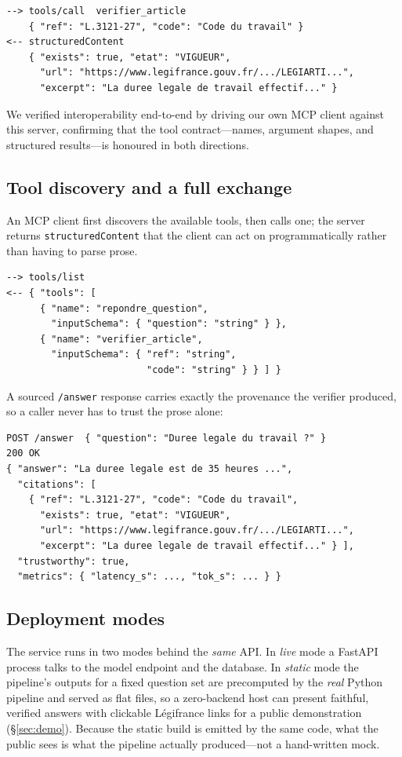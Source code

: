 \begin{lstlisting}[style=lr]
--> tools/call  verifier_article
    { "ref": "L.3121-27", "code": "Code du travail" }
<-- structuredContent
    { "exists": true, "etat": "VIGUEUR",
      "url": "https://www.legifrance.gouv.fr/.../LEGIARTI...",
      "excerpt": "La duree legale de travail effectif..." }
\end{lstlisting}

We verified interoperability end-to-end by driving our own MCP client against
this server, confirming that the tool contract---names, argument shapes, and
structured results---is honoured in both directions.

\subsection{Tool discovery and a full exchange}
An MCP client first discovers the available tools, then calls one; the server
returns \texttt{structuredContent} that the client can act on programmatically
rather than having to parse prose.

\begin{lstlisting}[style=lr]
--> tools/list
<-- { "tools": [
      { "name": "repondre_question",
        "inputSchema": { "question": "string" } },
      { "name": "verifier_article",
        "inputSchema": { "ref": "string",
                         "code": "string" } } ] }
\end{lstlisting}

A sourced \texttt{/answer} response carries exactly the provenance the verifier
produced, so a caller never has to trust the prose alone:

\begin{lstlisting}[style=lr]
POST /answer  { "question": "Duree legale du travail ?" }
200 OK
{ "answer": "La duree legale est de 35 heures ...",
  "citations": [
    { "ref": "L.3121-27", "code": "Code du travail",
      "exists": true, "etat": "VIGUEUR",
      "url": "https://www.legifrance.gouv.fr/.../LEGIARTI...",
      "excerpt": "La duree legale de travail effectif..." } ],
  "trustworthy": true,
  "metrics": { "latency_s": ..., "tok_s": ... } }
\end{lstlisting}

\subsection{Deployment modes}
The service runs in two modes behind the \emph{same} API. In \emph{live} mode a
FastAPI process talks to the model endpoint and the database. In \emph{static}
mode the pipeline's outputs for a fixed question set are precomputed by the
\emph{real} Python pipeline and served as flat files, so a zero-backend host
can present faithful, verified answers with clickable L\'egifrance links for a
public demonstration (\S\ref{sec:demo}). Because the static build is emitted by
the same code, what the public sees is what the pipeline actually
produced---not a hand-written mock.
